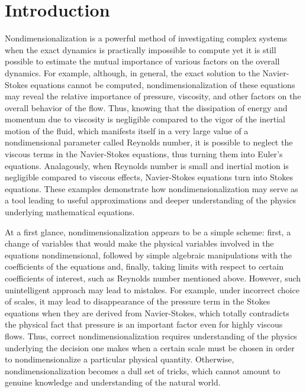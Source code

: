 \documentclass[oneside]{amsbook}
\theoremstyle{definition}
\theoremstyle{remark}
\numberwithin{section}{chapter}
\numberwithin{equation}{chapter}
\begin{document}
\setcounter{page}{4}
\setcounter{tocdepth}{2}

\tableofcontents

% 

\mainmatter

\chapter*{Introduction}

Nondimensionalization is a powerful method of investigating complex systems when the exact dynamics is practically impossible to compute yet it is still possible to estimate the mutual importance of various factors on the overall dynamics. For example, although, in general, the exact solution to the Navier-Stokes equations cannot be computed, nondimensionalization of these equations may reveal the relative importance of pressure, viscosity, and other factors on the overall behavior of the flow. Thus, knowing that the dissipation of energy and momentum due to viscosity is negligible compared to the vigor of the inertial motion of the fluid, which manifests itself in a very large value of a nondimensional parameter called Reynolds number, it is possible to neglect the viscous terms in the Navier-Stokes equations, thus turning them into Euler's equations. Analagously, when Reynolds number is small and inertial motion is negligible compared to viscous effects, Navier-Stokes equations turn into Stokes equations. These examples demonstrate how nondimensionalization may serve as a tool leading to useful approximations and deeper understanding of the physics underlying mathematical equations.

At a first glance, nondimensionalization appears to be a simple scheme: first, a change of variables that would make the physical variables involved in the equations nondimensional, followed by simple algebraic manipulations with the coefficients of the equations and, finally, taking limits with respect to certain coefficients of interest, such as Reynolds number mentioned above. However, such unintelligent approach may lead to mistakes. For example, under incorrect choice of scales, it may lead to disappearance of the pressure term in the Stokes equations when they are derived from Navier-Stokes, which totally contradicts the physical fact that pressure is an important factor even for highly viscous flows. Thus, correct nondimensionalization requires understanding of the physics underlying the decision one makes when a certain scale must be chosen in order to nondimensionalize a particular physical quantity. Otherwise, nondimensionalization becomes a dull set of tricks, which cannot amount to genuine knowledge and understanding of the natural world. 
\end{document}
